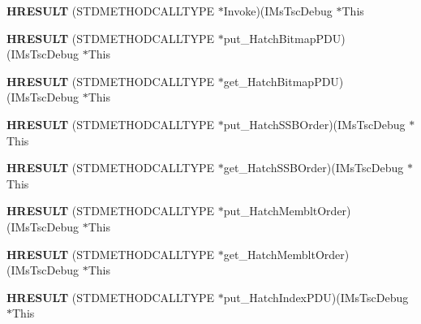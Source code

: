 \begin{DoxyCompactItemize}
\item 
\mbox{\label{struct_i_ms_tsc_debug_vtbl_ac55a3f55d6d7498ef1f008811dd06a3a}} 
{\bfseries H\+R\+E\+S\+U\+LT} (S\+T\+D\+M\+E\+T\+H\+O\+D\+C\+A\+L\+L\+T\+Y\+PE $\ast$Invoke)(I\+Ms\+Tsc\+Debug $\ast$This
\item 
\mbox{\label{struct_i_ms_tsc_debug_vtbl_af67f6be08afa5a0e6755faaef5e574e6}} 
{\bfseries H\+R\+E\+S\+U\+LT} (S\+T\+D\+M\+E\+T\+H\+O\+D\+C\+A\+L\+L\+T\+Y\+PE $\ast$put\+\_\+\+Hatch\+Bitmap\+P\+DU)(I\+Ms\+Tsc\+Debug $\ast$This
\item 
\mbox{\label{struct_i_ms_tsc_debug_vtbl_a9e75f342d7a9a682b8ee56596c7e50ad}} 
{\bfseries H\+R\+E\+S\+U\+LT} (S\+T\+D\+M\+E\+T\+H\+O\+D\+C\+A\+L\+L\+T\+Y\+PE $\ast$get\+\_\+\+Hatch\+Bitmap\+P\+DU)(I\+Ms\+Tsc\+Debug $\ast$This
\item 
\mbox{\label{struct_i_ms_tsc_debug_vtbl_acce30e29d84df83c31181691217bcfbf}} 
{\bfseries H\+R\+E\+S\+U\+LT} (S\+T\+D\+M\+E\+T\+H\+O\+D\+C\+A\+L\+L\+T\+Y\+PE $\ast$put\+\_\+\+Hatch\+S\+S\+B\+Order)(I\+Ms\+Tsc\+Debug $\ast$This
\item 
\mbox{\label{struct_i_ms_tsc_debug_vtbl_a71ab991dc2b61fd6a7e932de2ca896eb}} 
{\bfseries H\+R\+E\+S\+U\+LT} (S\+T\+D\+M\+E\+T\+H\+O\+D\+C\+A\+L\+L\+T\+Y\+PE $\ast$get\+\_\+\+Hatch\+S\+S\+B\+Order)(I\+Ms\+Tsc\+Debug $\ast$This
\item 
\mbox{\label{struct_i_ms_tsc_debug_vtbl_ad1fa9bdf09b80c3d34af91a3610b5fe4}} 
{\bfseries H\+R\+E\+S\+U\+LT} (S\+T\+D\+M\+E\+T\+H\+O\+D\+C\+A\+L\+L\+T\+Y\+PE $\ast$put\+\_\+\+Hatch\+Memblt\+Order)(I\+Ms\+Tsc\+Debug $\ast$This
\item 
\mbox{\label{struct_i_ms_tsc_debug_vtbl_af988d454f757422012e17680379db0d8}} 
{\bfseries H\+R\+E\+S\+U\+LT} (S\+T\+D\+M\+E\+T\+H\+O\+D\+C\+A\+L\+L\+T\+Y\+PE $\ast$get\+\_\+\+Hatch\+Memblt\+Order)(I\+Ms\+Tsc\+Debug $\ast$This
\item 
\mbox{\label{struct_i_ms_tsc_debug_vtbl_a8b73ef4934ebd7be0d9353e4aabee056}} 
{\bfseries H\+R\+E\+S\+U\+LT} (S\+T\+D\+M\+E\+T\+H\+O\+D\+C\+A\+L\+L\+T\+Y\+PE $\ast$put\+\_\+\+Hatch\+Index\+P\+DU)(I\+Ms\+Tsc\+Debug $\ast$This

\end{DoxyCompactItemize}
